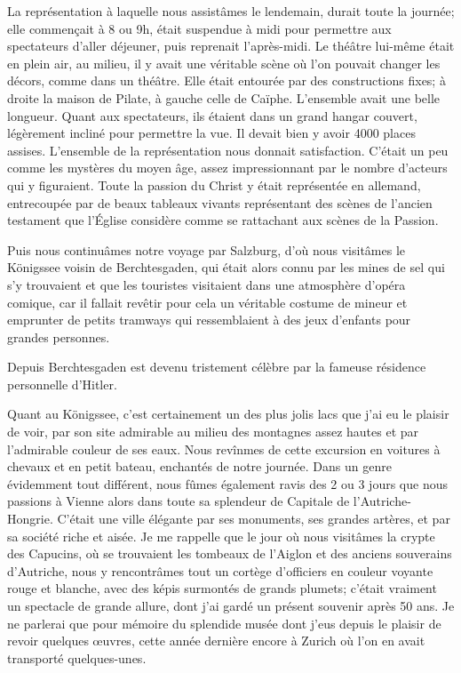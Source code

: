 \documentclass[11pt,a4paper]{report}
\begin{document}
La représentation à laquelle nous assistâmes le lendemain, durait toute la journée; elle commençait à 8 ou 9h, était suspendue à midi pour permettre aux spectateurs d'aller déjeuner, puis reprenait l'après-midi. Le théâtre lui-même était en plein air, au milieu, il y avait une véritable scène où l'on pouvait changer les décors, comme dans un théâtre. Elle était entourée par des constructions fixes; à droite la maison de Pilate, à gauche celle de Caïphe. L'ensemble avait une belle longueur. Quant aux spectateurs, ils étaient dans un grand hangar couvert, légèrement incliné pour permettre la vue. Il devait bien y avoir 4000 places assises. L'ensemble de la représentation nous donnait satisfaction. C'était un peu comme les mystères du moyen âge, assez impressionnant par le nombre d'acteurs qui y figuraient. Toute la passion du Christ y était représentée en allemand, entrecoupée par de beaux tableaux vivants représentant des scènes de l'ancien testament que l'Église considère comme se rattachant aux scènes de la Passion.

Puis nous continuâmes notre voyage par Salzburg, d'où nous visitâmes le Königssee voisin de Berchtesgaden, qui était alors connu par les mines de sel qui s'y trouvaient et que les touristes visitaient dans une atmosphère d'opéra comique, car il fallait revêtir pour cela un véritable costume de mineur et emprunter de petits tramways qui ressemblaient à des jeux d'enfants pour grandes personnes.

Depuis Berchtesgaden est devenu tristement célèbre par la fameuse résidence personnelle d'Hitler.

Quant au Königssee, c'est certainement un des plus jolis lacs que j'ai eu le plaisir de voir, par son site admirable au milieu des montagnes assez hautes et par l'admirable couleur de ses eaux. Nous revînmes de cette excursion en voitures à chevaux et en petit bateau, enchantés de notre journée. Dans un genre évidemment tout différent, nous fûmes également ravis des 2 ou 3 jours que nous passions à Vienne alors dans toute sa splendeur de Capitale de l'Autriche-Hongrie. C'était une ville élégante par ses monuments, ses grandes artères, et par sa société riche et aisée. Je me rappelle que le jour où nous visitâmes la crypte des Capucins, où se trouvaient les tombeaux de l'Aiglon et des anciens souverains d'Autriche, nous y rencontrâmes tout un cortège d'officiers en couleur voyante rouge et blanche, avec des képis surmontés de grands plumets; c'était vraiment un spectacle de grande allure, dont j'ai gardé un présent souvenir après 50 ans. Je ne parlerai que pour mémoire du splendide musée dont j'eus depuis le plaisir de revoir quelques œuvres, cette année dernière encore à Zurich où l'on en avait transporté quelques-unes.
\end{document}

